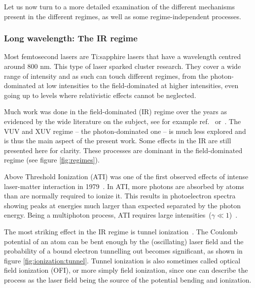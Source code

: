 Let us now turn to a more detailed examination of the different mechanisms
present in the different regimes, as well as some regime-independent processes.



\subsubsection{Long wavelength: The IR regime}
\label{section:intro:mechanisms:ir}

Most femtosecond lasers are Ti:sapphire lasers that have a wavelength centred around 800 nm.
This type of laser sparked cluster research. They cover a wide range of
intensity and as such can touch different regimes, from the photon-dominated
at low intensities to the field-dominated at higher intensities,
even going up to levels where relativistic effects cannot be neglected.

Much work was done in the field-dominated (IR) regime over the
years as evidenced by the wide literature on the subject, see for example
ref.~\cite{Fennel2010} or~\cite{Ramunno2008}. The VUV and XUV regime
-- the photon-dominated one -- is much less explored and is thus the main
aspect of the present work. Some effects in the IR are still presented here
for clarity. These processes are dominant in the field-dominated regime (see
figure \ref{fig:regimes}).



Above Threshold Ionization (ATI) was one of the first observed effects of
intense laser-matter interaction in 1979~\cite{Agostini1979}.
In ATI, more photons are absorbed by atoms
than are normally required to ionize it. This results in photoelectron spectra
showing peaks at energies much larger than expected separated by the photon
energy. Being a multiphoton process, ATI requires large
intensities~($\gamma \ll 1$)~\cite{Krainov1997,Lewenstein2008}.



The most striking effect in the IR regime is tunnel ionization~\cite{Niikura2009}.
The Coulomb potential of an atom can be bent enough by the (oscillating) laser
field and the probability of a bound electron tunnelling out becomes significant,
as shown in figure \ref{fig:ionization:tunnel}. Tunnel ionization is also
sometimes called optical field ionization (OFI), or more simply field
ionization, since one can describe the process as the laser field being the source
of the potential bending and ionization.



